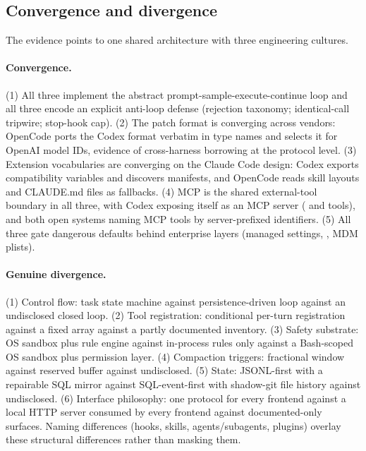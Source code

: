 \documentclass{article}
\newcommand{\codex}[0]{Codex}
\newcommand{\occ}[0]{OpenCode}
\newcommand{\ccc}[0]{Claude Code}
\begin{document}
\subsection{Convergence and divergence}
\label{sec:convergence}

The evidence points to one shared architecture with three engineering
cultures.

\paragraph{Convergence.} (1) All three implement the abstract
prompt-sample-execute-continue loop and all three encode an explicit
anti-loop defense (rejection taxonomy; identical-call tripwire; stop-hook
cap). (2) The patch format is converging across vendors: \occ{} ports the
\codex{}  format verbatim in type names and selects it
for OpenAI model IDs, evidence of cross-harness borrowing at the protocol
level. (3) Extension vocabularies are converging on the \ccc{} design:
\codex{} exports  compatibility variables and
discovers  manifests, and \occ{} reads 
skill layouts and CLAUDE.md files as fallbacks. (4) MCP is the shared
external-tool boundary in all three, with \codex{} exposing itself as an
MCP server ( and  tools), and both open
systems naming MCP tools by server-prefixed identifiers. (5) All three
gate dangerous defaults behind enterprise layers (managed settings,
, MDM plists).

\paragraph{Genuine divergence.} (1) Control flow: task state machine
against persistence-driven loop against an undisclosed closed loop.
(2) Tool registration: conditional per-turn registration against a fixed
array against a partly documented inventory. (3) Safety substrate: OS
sandbox plus rule engine against in-process rules only against a Bash-scoped
OS sandbox plus permission layer. (4) Compaction triggers: fractional
window against reserved buffer against undisclosed. (5) State: JSONL-first
with a repairable SQL mirror against SQL-event-first with shadow-git file
history against undisclosed. (6) Interface philosophy: one protocol for
every frontend against a local HTTP server consumed by every frontend
against documented-only surfaces. Naming differences (hooks, skills,
agents/subagents, plugins) overlay these structural differences rather than
masking them.
\end{document}
